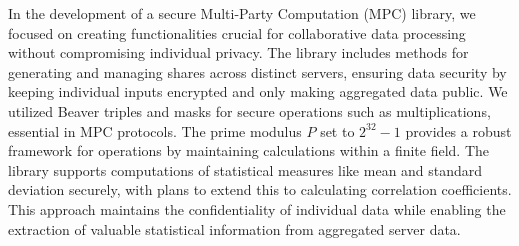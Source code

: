 \documentclass[conference]{IEEEtran}
\begin{document}
In the development of a secure Multi-Party Computation (MPC) library, we focused on creating functionalities crucial for collaborative data processing without compromising individual privacy. The library includes methods for generating and managing shares across distinct servers, ensuring data security by keeping individual inputs encrypted and only making aggregated data public. We utilized Beaver triples and masks for secure operations such as multiplications, essential in MPC protocols. The prime modulus \( P \) set to \( 2^{32} - 1 \) provides a robust framework for operations by maintaining calculations within a finite field. The library supports computations of statistical measures like mean and standard deviation securely, with plans to extend this to calculating correlation coefficients. This approach maintains the confidentiality of individual data while enabling the extraction of valuable statistical information from aggregated server data.
\end{document}
